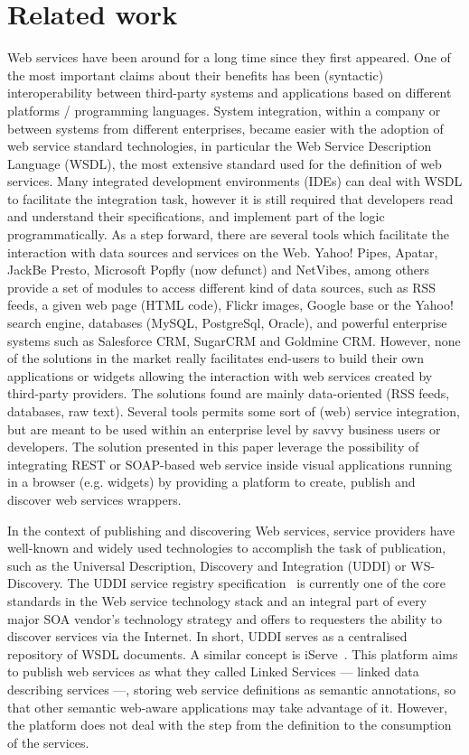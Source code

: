 
\section{Related work}
\label{sec:related_work}

Web services have been around for a long time since they first appeared.
One of the most important claims about their benefits has been (syntactic) interoperability between third-party systems and applications based on different platforms / programming languages. 
System integration, within a company or between systems from different enterprises, became easier with the adoption of web service standard technologies, in particular the Web Service Description Language (WSDL), the most extensive standard used for the definition of web services. 
Many integrated development environments (IDEs) can deal with WSDL to facilitate the integration task, however it is still required that developers read and understand their specifications, and implement part of the logic programmatically. 
As a step forward, there are several tools which facilitate the interaction with data sources and services on the Web. Yahoo! Pipes, Apatar, JackBe Presto, Microsoft Popfly (now defunct) and NetVibes, among others provide a set of modules to access different kind of data sources, such as RSS feeds, a given web page (HTML code), Flickr images, Google base or the Yahoo! search engine, databases (MySQL, PostgreSql, Oracle), and powerful enterprise systems such as Salesforce CRM, SugarCRM and Goldmine CRM. 
However, none of the solutions in the market really facilitates end-users to build  their own applications or widgets allowing the interaction with web services created by third-party providers. The solutions found are mainly data-oriented (RSS feeds, databases, raw text). Several tools permits some sort of (web) service integration, but are meant to be used within an enterprise level by savvy business users or developers. The solution presented in this paper leverage the possibility of integrating REST or SOAP-based web service inside visual applications running in a browser (e.g. widgets) by providing a platform to create, publish and discover web services wrappers.

In the context of publishing and discovering Web services, service providers have well-known and widely used technologies to accomplish the task of publication, such as the Universal Description, Discovery and Integration (UDDI) or WS-Discovery. The UDDI service registry specification~\cite{uddi2004} is currently one of the core standards in the Web service technology stack and an integral part of every major SOA vendor's technology strategy and offers to requesters the ability to discover services via the Internet. 
In short, UDDI serves as a centralised repository of WSDL documents. A similar concept is iServe~\cite{pedrinaci_ores2010}. This platform aims to publish web services as what they called Linked Services --- linked data describing services ---, storing web service definitions as semantic annotations, so that other semantic web-aware applications may take advantage of it. However, the platform does not deal with the step from the definition to the consumption of the services.

